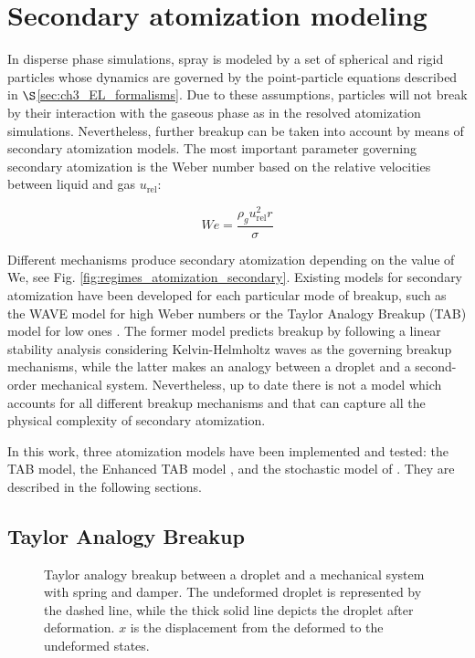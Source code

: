 \section{Secondary atomization modeling}
\label{sec:ch4_secondary_atomization_modeling}

In disperse phase simulations, spray is modeled by a set of spherical and rigid particles whose dynamics are governed by the point-particle equations described in $\S$\ref{sec:ch3_EL_formalisms}. Due to these assumptions, particles will not break by their interaction with the gaseous phase as in the resolved atomization simulations. Nevertheless, further breakup can be taken into account by means of secondary atomization models. The most important parameter governing secondary atomization is the Weber number based on the relative velocities between liquid and gas $u_\mathrm{rel}$:

\begin{equation}
\label{eq:We_secondary_atomization_definition}
We = \frac{\rho_g u_\mathrm{rel}^2 r}{\sigma} 
\end{equation}

Different mechanisms produce secondary atomization depending on the value of We, see Fig. \ref{fig:regimes_atomization_secondary}. Existing models for secondary atomization have been developed for each particular mode of breakup, such as the WAVE model for high Weber numbers  or the Taylor Analogy Breakup (TAB) model for low ones . The former model predicts breakup by following a linear stability analysis considering Kelvin-Helmholtz waves as the governing breakup mechanisms, while the latter makes an analogy between a droplet and a second-order mechanical system. Nevertheless, up to date there is not a model which accounts for all different breakup mechanisms and that can capture all the physical complexity of secondary atomization.

In this work, three atomization models have been implemented and tested: the TAB model, the Enhanced TAB model , and the stochastic model of . They are described in the following sections.

\subsection{Taylor Analogy Breakup}


\begin{figure}[h!]
	\centering
	\caption{Taylor analogy breakup between a droplet and a mechanical system with spring and damper. The undeformed droplet is represented by the dashed line, while the thick solid line depicts the droplet after deformation. $x$ is the displacement from the deformed to the undeformed states.}
	\label{fig:TAB_droplet_deformation}
\end{figure}

